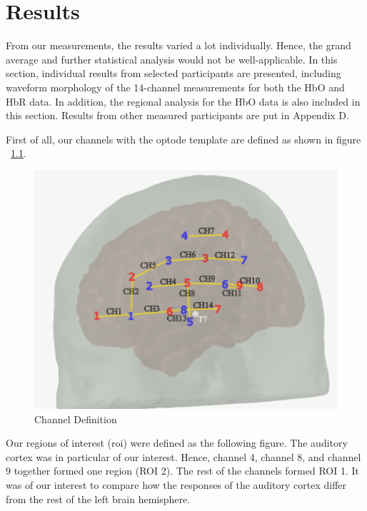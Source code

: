 \chapter{Results}

From our measurements, the results varied a lot individually. Hence, the grand average and further statistical analysis would not be well-applicable. In this section, individual results from selected participants are presented, including waveform morphology of the 14-channel measurements for both the HbO and HbR data. In addition, the regional analysis for the HbO data is also included in this section. Results from other measured participants are put in Appendix D.

First of all, our channels with the optode template are defined as shown in figure ~\ref{fig:ChannelDef}.

\begin{figure}[H]
  \centering
    \includegraphics[scale=.45]{bilder/optode_ink.png}
  \caption{Channel Definition}
  \label{fig:ChannelDef}
\end{figure}


Our regions of interest (\acrshort{roi}) were defined as the following figure. The auditory cortex was in particular of our interest. Hence, channel 4, channel 8, and channel 9 together formed one region (ROI 2). The rest of the channels formed ROI 1. It was of our interest to compare how the responses of the auditory cortex differ from the rest of the left brain hemisphere.


